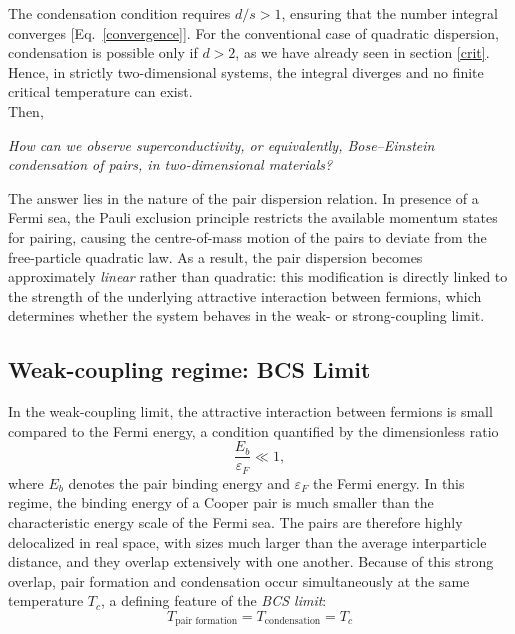The condensation condition requires \(d/s > 1\), ensuring that the number integral converges [Eq.~\eqref{convergence}]. For the conventional case of quadratic dispersion, condensation is possible only if \(d > 2\), as we have already seen in section \ref{crit}. Hence, in strictly two-dimensional systems, the integral diverges and no finite critical temperature can exist.\\
Then, 
\begin{center}
    \textit{How can we observe superconductivity, or equivalently, Bose--Einstein condensation of pairs, in two-dimensional materials?}
\end{center}
The answer lies in the nature of the pair dispersion relation.  
In presence of a Fermi sea, the Pauli exclusion principle restricts the available momentum states for pairing, causing the centre-of-mass motion of the pairs to deviate from the free-particle quadratic law.  
As a result, the pair dispersion becomes approximately \emph{linear} rather than quadratic: this modification is directly linked to the strength of the underlying attractive interaction between fermions, which determines whether the system behaves in the weak- or strong-coupling limit.

\subsection*{Weak-coupling regime: BCS Limit}

In the weak-coupling limit, the attractive interaction between fermions is small compared to the Fermi energy, a condition quantified by the dimensionless ratio
\[
\frac{E_b}{\varepsilon_F} \ll 1,
\]
where \(E_b\) denotes the pair binding energy and \(\varepsilon_F\) the Fermi energy.  
In this regime, the binding energy of a Cooper pair is much smaller than the characteristic energy scale of the Fermi sea.  
The pairs are therefore highly delocalized in real space, with sizes much larger than the average interparticle distance, and they overlap extensively with one another.  
Because of this strong overlap, pair formation and condensation occur simultaneously at the same temperature \(T_c\), a defining feature of the \textit{BCS limit}:
\[
T_{\text{pair formation}} = 
T_{\text{condensation}} = T_c
\]

